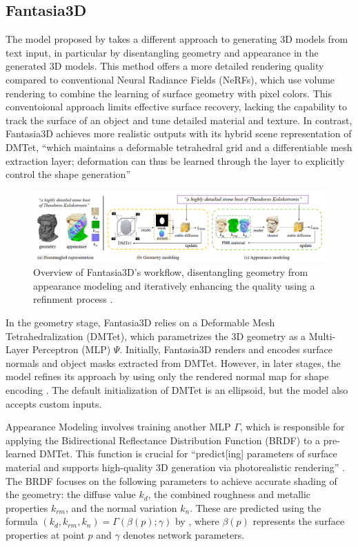 \subsection{Fantasia3D}\label{fantasia3D}

The model proposed by \citeauthor{chen2023fantasia3d} takes a different approach to generating 3D models from text input, in particular by disentangling geometry and appearance in the generated 3D models.
This method offers a more detailed rendering quality compared to conventional Neural Radiance Fields (NeRFs), which use volume rendering to combine the learning of surface geometry with pixel colors. This conventoional approach limits effective surface recovery, lacking the capability to track the surface of an object and tune detailed material and texture. In contrast, Fantasia3D achieves more realistic outputs with its hybrid scene representation of DMTet, ``which maintains a deformable tetrahedral grid and a differentiable mesh extraction layer; deformation can thus be learned through the layer to explicitly control the shape generation'' \citep{chen2023fantasia3d}

\begin{figure}[ht]
  \centering
    \includegraphics[width=1\columnwidth]{figures/Fantasia3D.png}
    \caption{Overview of Fantasia3D's workflow, disentangling geometry from appearance modeling and iteratively enhancing the quality using a refinment process \citep{chen2023fantasia3d}.}\label{fig:figureFantasia}
\end{figure}

In the geometry stage, Fantasia3D relies on a Deformable Mesh Tetrahedralization (DMTet), which parametrizes the 3D geometry as a Multi-Layer Perceptron (MLP) \(\Psi\). Initially, Fantasia3D renders and encodes surface normals and object masks extracted from DMTet. However, in later stages, the model refines its approach by using only the rendered normal map for shape encoding \citep{chen2023fantasia3d}. The default initialization of DMTet is an ellipsoid, but the model also accepts custom inputs.

Appearance Modeling involves training another MLP \( \Gamma \), which is responsible for applying the Bidirectional Reflectance Distribution Function (BRDF) \citep{chen2023fantasia3d} to a pre-learned DMTet. This function is crucial for ``predict[ing] parameters of surface material and supports high-quality 3D generation via photorealistic rendering'' \citep{chen2023fantasia3d}. The BRDF focuses on the following parameters to achieve accurate shading of the geometry: the diffuse value \(k_d\), the combined roughness and metallic properties \(k_{rm}\), and the normal variation \(k_n\). These are predicted using the formula \((k_d, k_{rm}, k_n) = \Gamma(\beta(p); \gamma)\) by \citeauthor{chen2023fantasia3d}, where \(\beta(p)\) represents the surface properties at point \(p\) and \(\gamma\) denotes network parameters.


